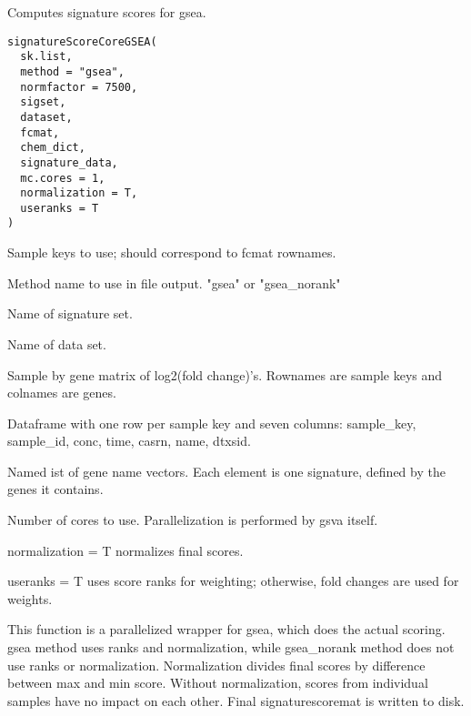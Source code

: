 \documentclass[letterpaper]{book}
\begin{document}
%
\begin{Description}\relax
Computes signature scores for gsea.
\end{Description}
%
\begin{Usage}
\begin{verbatim}
signatureScoreCoreGSEA(
  sk.list,
  method = "gsea",
  normfactor = 7500,
  sigset,
  dataset,
  fcmat,
  chem_dict,
  signature_data,
  mc.cores = 1,
  normalization = T,
  useranks = T
)
\end{verbatim}
\end{Usage}
%
\begin{Arguments}
\begin{ldescription}
\item[\code{sk.list}] Sample keys to use; should correspond to fcmat rownames.

\item[\code{method}] Method name to use in file output. "gsea" or "gsea\_norank"

\item[\code{sigset}] Name of signature set.

\item[\code{dataset}] Name of data set.

\item[\code{fcmat}] Sample by gene matrix of log2(fold change)'s. Rownames are
sample keys and colnames are genes.

\item[\code{chem\_dict}] Dataframe with one row per sample key and seven columns:
sample\_key, sample\_id, conc, time, casrn, name, dtxsid.

\item[\code{signature\_data}] Named ist of gene name vectors. Each element is one
signature, defined by the genes it contains.

\item[\code{mc.cores}] Number of cores to use. Parallelization is performed
by gsva itself.

\item[\code{normalization}] normalization = T normalizes final scores.

\item[\code{useranks}] useranks = T uses score ranks for weighting; otherwise,
fold changes are used for weights.
\end{ldescription}
\end{Arguments}
%
\begin{Details}\relax
This function is a parallelized wrapper for gsea, which does the actual
scoring. gsea method uses ranks and normalization, while gsea\_norank
method does not use ranks or normalization. Normalization divides final
scores by difference between max and min score. Without normalization,
scores from individual samples have no impact on each other. Final
signaturescoremat is written to disk.
\end{Details}
\end{document}
